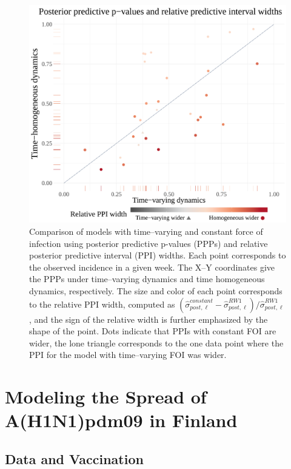 \begin{figure}[htbp]
	\centering
	\includegraphics[width=0.8\linewidth]{figures/sinfoi_ppi_comp}
	\caption[Comparison with posterior predictive p-values and relative predictive interval widths for SIRS models fit to an outbreak with time--varying dynamics.]{Comparison of models with time--varying and constant force of infection using posterior predictive p-values (PPPs) and relative posterior predictive interval (PPI) widths. Each point corresponds to the observed incidence in a given week. The X--Y coordinates give the PPPs under time--varying dynamics and time homogeneous dynamics, respectively. The size and color of each point corresponds to the relative PPI width, computed as $ (\widehat{\sigma}_{post,\ell}^{constant} - \widehat{\sigma}_{post,\ell}^{RW1})/\widehat{\sigma}_{post,\ell}^{RW1} $, and the sign of the relative width is further emphasized by the shape of the point. Dots indicate that PPIs with constant FOI are wider, the lone triangle corresponds to the one data point where the PPI for the model with time--varying FOI was wider.}
	\label{fig:sinfoi_ppi_comp}
\end{figure}

\newpage
\section{Modeling the Spread of A(H1N1)pdm09 in Finland}
\label{sec:flu_tparam_models}

\subsection{Data and Vaccination}
\label{subsec:flu_datavacc}


